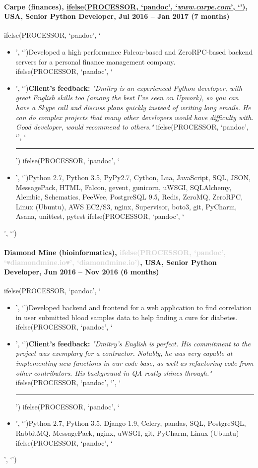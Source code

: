 \documentclass[a4paper,8pt]{extarticle}
\newcommand{\chref}[2]{\href{#1}
{ifelse(PROCESSOR, `pandoc', `#2', `\underline{\smash{#2}}')}}
\newcommand{\itchref}[2]{\chref{#1}{\textit{#2}}}  %
\newcommand{\chrule}{ifelse(PROCESSOR, `pandoc', `', `\vspace{3pt}\hrule')}
\newcommand{\brokenhreflg}[1]{\textcolor{lightgray}{ifelse(PROCESSOR, `pandoc', `♥#1♥', `#1')}}
\newcommand{\pdbeginitemize}{ifelse(PROCESSOR, `pandoc', `\begin{itemize}', `')}
\newcommand{\pditem}{ifelse(PROCESSOR, `pandoc', `\item', `')}
\newcommand{\pdenditemize}{ifelse(PROCESSOR, `pandoc', `\end{itemize}', `')}
\begin{document}
\paragraph*{Carpe (finances), \itchref{https://www.carpe.com}{www.carpe.com}, USA, Senior Python Developer, Jul 2016 -- Jan 2017 (7 months)}
\pdbeginitemize
\pditem Developed a high performance Falcon-based and ZeroRPC-based backend servers for a personal finance management company.\\
\pditem \textbf{Client's feedback:} \textit{"Dmitry is an experienced Python developer, with great English skills too (among the best I've seen on Upwork), so you can have a Skype call and discuss plans quickly instead of writing long emails. He can do complex projects that many other developers would have difficulty with. Good developer, would recommend to others."}
\chrule
\pditem Python 2.7, Python 3.5, PyPy2.7, Cython, Lua, JavaScript, SQL, JSON, MessagePack, HTML, Falcon, gevent, gunicorn, uWSGI, SQLAlchemy, Alembic, Schematics, PeeWee, PostgreSQL 9.5, Redis, ZeroMQ, ZeroRPC, Linux (Ubuntu), AWS EC2/S3, nginx, Supervisor, boto3, git, PyCharm, Asana, unittest, pytest
\pdenditemize

\paragraph*{Diamond Mine (bioinformatics), \brokenhreflg{diamondmine.io}, USA, Senior Python Developer, Jun 2016 -- Nov 2016 (6 months)}
\pdbeginitemize
\pditem Developed backend and frontend for a web application to find correlation in user submitted blood samples data to help finding a cure for diabetes.\\
\pditem \textbf{Client's feedback:} \textit{"Dmitry's English is perfect. His commitment to the project was exemplary for a contractor. Notably, he was very capable at implementing new functions in our code base, as well as refactoring code from other contributors. His background in QA really shines through."}
\chrule
\pditem Python 2.7, Python 3.5, Django 1.9, Celery, pandas, SQL, PostgreSQL, RabbitMQ, MessagePack, nginx, uWSGI, git, PyCharm, Linux (Ubuntu)
\pdenditemize

\pagebreak
\end{document}
